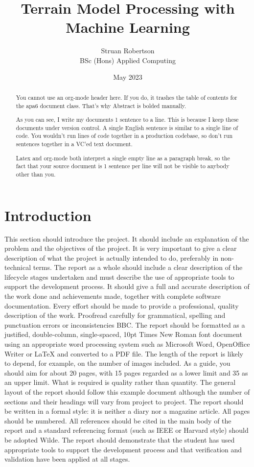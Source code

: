 \documentclass[twocolumn]{article}
\author{Struan Robertson \\ BSc (Hons) Applied Computing}
\date{May 2023}
\title{Terrain Model Processing with Machine Learning}
\begin{document}
\maketitle
\begin{abstract}

You cannot use an org-mode header here.
If you do, it trashes the table of contents for the apa6 document class.
That's why Abstract is bolded manually.

As you can see, I write my documents 1 sentence to a line.
This is because I keep these documents under version control.
A single English sentence is similar to a single line of code.
You wouldn't run lines of code together in a production codebase, so don't run sentences together in a VC'ed text document.

Latex and org-mode both interpret a single empty line as a paragraph break, so the fact that your source document is 1 sentence per line will not be visible to anybody other than you.
\end{abstract}

\section{Introduction}
\label{sec:org8354b9e}

This section should introduce the project. It should include an explanation of the problem and the objectives of the project. It is very important to give a clear description of what the project is actually intended to do, preferably in non-technical terms. The report as a whole should include a clear description of the lifecycle stages undertaken and must describe the use of appropriate tools to support the development process. It should give a full and accurate description of the work done and achievements made, together with complete software documentation. Every effort should be made to provide a professional, quality description of the work. Proofread carefully for grammatical, spelling and punctuation errors or inconsistencies BBC. The report should be formatted as a justified, double-column, single-spaced, 10pt Times New Roman font document using an appropriate word processing system such as Microsoft Word, OpenOffice Writer or \LaTeX{} and converted to a PDF file. The length of the report is likely to depend, for example, on the number of images included. As a guide, you should aim for about 20 pages, with 15 pages regarded as a lower limit and 35 as an upper limit. What is required is quality rather than quantity. The general layout of the report should follow this example document although the number of sections and their headings will vary from project to project. The report should be written in a formal style: it is neither a diary nor a magazine article. All pages should be numbered. All references should be cited in the main body of the report and a standard referencing format (such as IEEE or Harvard style) should be adopted Wilde. The report should demonstrate that the student has used appropriate tools to support the development process and that verification and validation have been applied at all stages.
\end{document}
